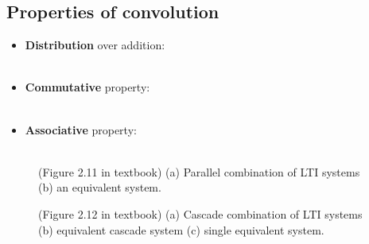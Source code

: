 \documentclass[10pt,a4paper,report]{report}       %
\begin{document}
\subsection{Properties of convolution}
\begin{itemize}
 \item \textbf{Distribution} over addition:\\ \\
 \item \textbf{Commutative} property:\\ \\
 \item \textbf{Associative} property:\\ \\
\end{itemize}
\begin{figure}[ht]
\centering
\begin{minipage}{.45\textwidth}
  \centering
  \caption{}{(Figure 2.11 in textbook) (a) Parallel combination of LTI systems (b) an equivalent system.}
  \label{fig:test1}
\end{minipage}%
\begin{minipage}{.45\textwidth}
  \centering
  \caption{}{(Figure 2.12 in textbook) (a) Cascade combination of LTI systems (b) equivalent cascade system (c) single equivalent system.}
  \label{fig:test2}
\end{minipage}
\end{figure}
\end{document}
